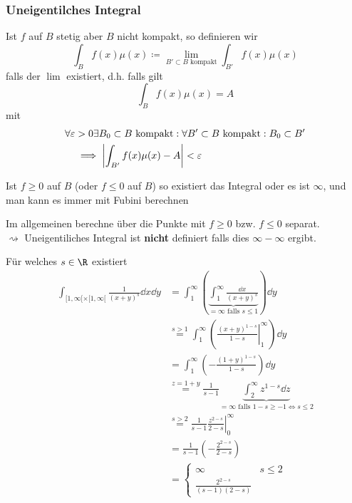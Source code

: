 \subsubsection{Uneigentilches Integral}
\begin{def*}[note = Uneigentliches Integral , index = uneigentliches Integral , indexformat = {2!1~}]
	Ist $f$ auf $B$ stetig aber $B$ nicht kompakt, so definieren wir
	\[ \int_B f(x) \mu(x) \coloneqq \lim_{B' \subset B \text{ kompakt}} \int_{B'} f(x) \mu(x) \]
	falls der $\lim$ existiert, d.h. falls gilt
	\[ \int_B f(x) \mu(x) = A \]
	mit
	\[ \begin{split}
		&\forall \epsilon > 0 \exists B_0 \subset B \text{ kompakt}: \forall B' \subset B \text{ kompakt} : B_0 \subset B' \\
		&\quad\implies \abs{\int_{B'} f(x) \mu(x) - A} < \epsilon
	\end{split} \]
\end{def*}
\begin{bem}
	Ist $f \geq 0$ auf $B$ (oder $f \leq 0$ auf $B$) so existiert das Integral oder es ist $\infty$, und man kann es immer mit Fubini berechnen
\end{bem}
\begin{bem}
	Im allgemeinen berechne über die Punkte mit $f \geq 0$ bzw. $f \leq 0$ separat. \\
	$\rightsquigarrow$ Uneigentiliches Integral ist \textbf{nicht} definiert falls dies $\infty - \infty$ ergibt.
\end{bem}
\begin{bsp*}
	Für welches $s \in \R$ existiert
	\[ \begin{split}
		\int_{[1 , \infty [ \times [ 1 , \infty [} \frac{1}{(x+y)^s} \dd x \dd y
			&= \int_1^\infty \left( \underbrace{\int_1^\infty \frac{\dd x}{(x+y)^s}}_{=\infty \text{ falls } s \leq 1} \right) \dd y \\
			&\overset{s > 1}{=} \int_1^\infty \left( \left. \frac{(x+y)^{1-s}}{1-s} \right|_1^\infty \right) \dd y \\
			&= \int_1^\infty \left( - \frac{(1+y)^{1-s}}{1-s} \right) \dd y \\
			&\overset{z=1+y}{=} \frac{1}{s-1} \underbrace{\int_2^\infty z^{1-s} \dd z}_{=\infty \text{ falls } 1-s \geq -1 \iff s \leq 2} \\
			&\overset{s > 2}{=} \frac{1}{s-1} \left. \frac{z^{2-s}}{2-s} \right|_0^\infty \\
			&= \frac{1}{s-1} \left( -\frac{2^{2-s}}{2-s} \right) \\
			&= \begin{cases} \infty & s \leq 2 \\ \frac{2^{2-s}}{(s-1)(2-s)} \end{cases}
	\end{split} \]
\end{bsp*}
